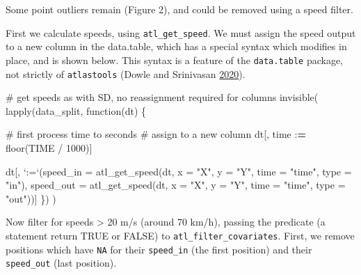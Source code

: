 \documentclass[]{scrreprt}
\newenvironment{Shaded}{}{}
\newcommand{\CommentTok}[1]{\textcolor[rgb]{0.00,0.50,0.00}{#1}}
\newcommand{\ControlFlowTok}[1]{\textcolor[rgb]{0.00,0.00,1.00}{#1}}
\newcommand{\DataTypeTok}[1]{#1}
\newcommand{\DecValTok}[1]{#1}
\newcommand{\ErrorTok}[1]{\textcolor[rgb]{1.00,0.00,0.00}{\textbf{#1}}}
\newcommand{\KeywordTok}[1]{\textcolor[rgb]{0.00,0.00,1.00}{#1}}
\newcommand{\NormalTok}[1]{#1}
\newcommand{\OperatorTok}[1]{#1}
\newcommand{\StringTok}[1]{\textcolor[rgb]{0.00,0.50,0.50}{#1}}
\begin{document}
Some point outliers remain (Figure 2), and could be removed using a speed filter.

First we calculate speeds, using \texttt{atl\_get\_speed}. We must assign the speed output to a new column in the data.table, which has a special syntax which modifies in place, and is shown below. This syntax is a feature of the \texttt{data.table} package, not strictly of \texttt{atlastools} (Dowle and Srinivasan \protect\hyperlink{ref-dowle2020}{2020}).

\begin{Shaded}
\begin{Highlighting}[]
\CommentTok{# get speeds as with SD, no reassignment required for columns}
\KeywordTok{invisible}\NormalTok{(}
  \KeywordTok{lapply}\NormalTok{(data_split, }\ControlFlowTok{function}\NormalTok{(dt) \{}
    
    \CommentTok{# first process time to seconds}
    \CommentTok{# assign to a new column}
\NormalTok{    dt[, time }\OperatorTok{:}\ErrorTok{=}\StringTok{ }\KeywordTok{floor}\NormalTok{(TIME }\OperatorTok{/}\StringTok{ }\DecValTok{1000}\NormalTok{)]}
    
\NormalTok{    dt[, }\StringTok{`}\DataTypeTok{:=}\StringTok{`}\NormalTok{(}\DataTypeTok{speed_in =} \KeywordTok{atl_get_speed}\NormalTok{(dt, }
                                       \DataTypeTok{x =} \StringTok{"X"}\NormalTok{, }\DataTypeTok{y =} \StringTok{"Y"}\NormalTok{, }
                                       \DataTypeTok{time =} \StringTok{"time"}\NormalTok{,}
                                       \DataTypeTok{type =} \StringTok{"in"}\NormalTok{),}
              \DataTypeTok{speed_out =} \KeywordTok{atl_get_speed}\NormalTok{(dt, }
                                       \DataTypeTok{x =} \StringTok{"X"}\NormalTok{, }\DataTypeTok{y =} \StringTok{"Y"}\NormalTok{, }
                                       \DataTypeTok{time =} \StringTok{"time"}\NormalTok{,}
                                       \DataTypeTok{type =} \StringTok{"out"}\NormalTok{))]}
\NormalTok{  \})}
\NormalTok{)}
\end{Highlighting}
\end{Shaded}

Now filter for speeds \textgreater{} 20 m/s (around 70 km/h), passing the predicate (a statement return TRUE or FALSE) to \texttt{atl\_filter\_covariates}. First, we remove positions which have \texttt{NA} for their \texttt{speed\_in} (the first position) and their \texttt{speed\_out} (last position).
\end{document}
